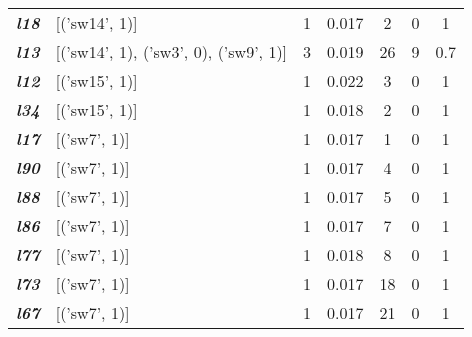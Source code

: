 \begin{table}
\begin{tabular}{llccccc}
    \textit{\textbf{l18}}                                           & {[}('sw14', 1){]}                         & 1             & 0.017              & 2              & 0              & 1           \\
    \textit{\textbf{l13}}                                           & {[}('sw14', 1), ('sw3', 0), ('sw9', 1){]} & 3             & 0.019              & 26             & 9              & 0.7         \\
    \textit{\textbf{l12}}                                           & {[}('sw15', 1){]}                         & 1             & 0.022              & 3              & 0              & 1           \\
    \textit{\textbf{l34}}                                           & {[}('sw15', 1){]}                         & 1             & 0.018              & 2              & 0              & 1           \\
    \textit{\textbf{l17}}                                           & {[}('sw7', 1){]}                          & 1             & 0.017              & 1              & 0              & 1           \\
    \textit{\textbf{l90}}                                           & {[}('sw7', 1){]}                          & 1             & 0.017              & 4              & 0              & 1           \\
    \textit{\textbf{l88}}                                           & {[}('sw7', 1){]}                          & 1             & 0.017              & 5              & 0              & 1           \\
    \textit{\textbf{l86}}                                           & {[}('sw7', 1){]}                          & 1             & 0.017              & 7              & 0              & 1           \\
    \textit{\textbf{l77}}                                           & {[}('sw7', 1){]}                          & 1             & 0.018              & 8              & 0              & 1           \\
    \textit{\textbf{l73}}                                           & {[}('sw7', 1){]}                          & 1             & 0.017              & 18             & 0              & 1           \\
    \textit{\textbf{l67}}                                           & {[}('sw7', 1){]}                          & 1             & 0.017              & 21             & 0              & 1           \\

\end{tabular}
\end{table}
